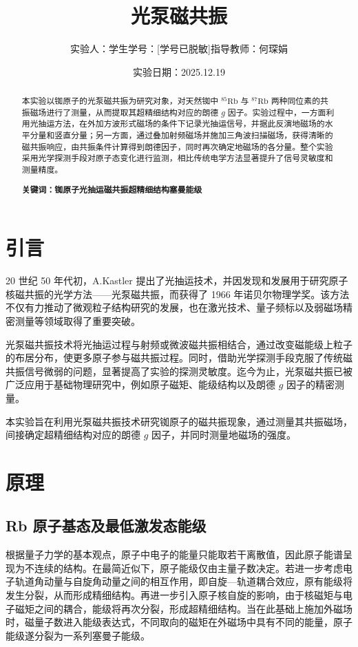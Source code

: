 \documentclass[a4paper, 1.5lines]{ctexart}
\title{光泵磁共振}
\author{实验人：学生\qquad 学号：[学号已脱敏]\qquad 指导教师：何琛娟}
\date{实验日期：2025.12.19}
\begin{document}
    
    \maketitle
            
    \begin{abstract}
         本实验以铷原子的光泵磁共振为研究对象，对天然铷中 \(^{85}\mathrm{Rb}\) 与 \(^{87}\mathrm{Rb}\) 两种同位素的共振磁场进行了测量，从而提取其超精细结构对应的朗德 \(g\) 因子。实验过程中，一方面利用光抽运方法，在外加方波形式磁场的条件下记录光抽运信号，并据此反演地磁场的水平分量和竖直分量；另一方面，通过叠加射频磁场并施加三角波扫描磁场，获得清晰的磁共振响应，由共振条件计算得到朗德因子，同时再次确定地磁场的各分量。整个实验采用光学探测手段对原子态变化进行监测，相比传统电学方法显著提升了信号灵敏度和测量精度。
    
        \textbf{\textbf{关键词：铷原子\quad 光抽运\quad 磁共振\quad 超精细结构\quad 塞曼能级 }}
    \end{abstract}
    
    \section{引言}
        20 世纪 50 年代初，A.Kastler 提出了光抽运技术，并因发现和发展用于研究原子核磁共振的光学方法——光泵磁共振，而获得了 1966 年诺贝尔物理学奖。该方法不仅有力推动了微观粒子结构研究的发展，也在激光技术、量子频标以及弱磁场精密测量等领域取得了重要突破。

        光泵磁共振技术将光抽运过程与射频或微波磁共振相结合，通过改变磁能级上粒子的布居分布，使更多原子参与磁共振过程。同时，借助光学探测手段克服了传统磁共振信号微弱的问题，显著提高了实验的探测灵敏度。迄今为止，光泵磁共振已被广泛应用于基础物理研究中，例如原子磁矩、能级结构以及朗德 \(g\) 因子的精密测量。

        本实验旨在利用光泵磁共振技术研究铷原子的磁共振现象，通过测量其共振磁场，间接确定超精细结构对应的朗德 \(g\) 因子，并同时测量地磁场的强度。
    \section{原理}
        \subsection{Rb 原子基态及最低激发态能级}

根据量子力学的基本观点，原子中电子的能量只能取若干离散值，因此原子能谱呈现为不连续的结构。在最简近似下，原子能级仅由主量子数决定。若进一步考虑电子轨道角动量与自旋角动量之间的相互作用，即自旋—轨道耦合效应，原有能级将发生分裂，从而形成精细结构。再进一步引入原子核自旋的影响，由于核磁矩与电子磁矩之间的耦合，能级将再次分裂，形成超精细结构。当在此基础上施加外磁场时，磁量子数进入能级表达式，不同取向的磁矩在外磁场中具有不同的能量，原子能级遂分裂为一系列塞曼子能级。
\end{document}

